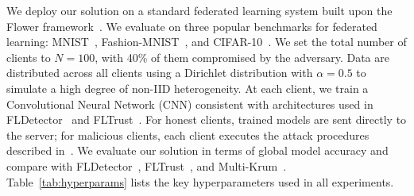 \documentclass[journal]{IEEEtran}
\begin{document}
We deploy our solution on a standard federated learning system built upon the Flower framework~\cite{beutel2020flower}. We evaluate on three popular benchmarks for federated learning: MNIST~\cite{lecun1998mnist}, Fashion-MNIST~\cite{xiao2017fashion}, and CIFAR-10~\cite{krizhevsky2009cifar}. We set the total number of clients to $N = 100$, with 40\% of them compromised by the adversary. Data are distributed across all clients using a Dirichlet distribution with $\alpha = 0.5$ to simulate a high degree of non-IID heterogeneity. At each client, we train a Convolutional Neural Network (CNN) consistent with architectures used in FLDetector~\cite{zhang2022fldetector} and FLTrust~\cite{cao2020fltrust}. For honest clients, trained models are sent directly to the server; for malicious clients, each client executes the attack procedures described in~\cite{baruch2019little, fang2020local}. We evaluate our solution in terms of global model accuracy and compare with FLDetector~\cite{zhang2022fldetector}, FLTrust~\cite{cao2020fltrust}, and Multi-Krum~\cite{blanchard2017machine}. Table~\ref{tab:hyperparams} lists the key hyperparameters used in all experiments.
\end{document}
